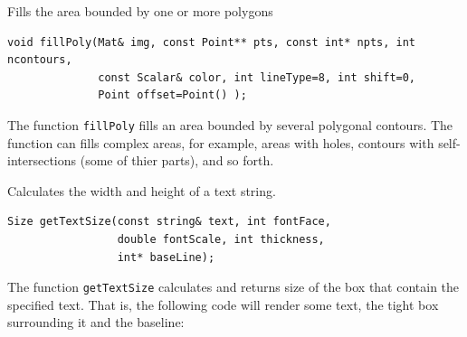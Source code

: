 \label{fillPoly}
Fills the area bounded by one or more polygons

\begin{lstlisting}
void fillPoly(Mat& img, const Point** pts, const int* npts, int ncontours,
              const Scalar& color, int lineType=8, int shift=0,
              Point offset=Point() );
\end{lstlisting}
\begin{description}
\end{description}

The function \texttt{fillPoly} fills an area bounded by several
polygonal contours. The function can fills complex areas, for example,
areas with holes, contours with self-intersections (some of thier parts), and so forth.

\label{getTextSize}
Calculates the width and height of a text string.

\begin{lstlisting}
Size getTextSize(const string& text, int fontFace,
                 double fontScale, int thickness,
                 int* baseLine);
\end{lstlisting}
\begin{description}
\end{description}

The function \texttt{getTextSize} calculates and returns size of the box that contain the specified text.
That is, the following code will render some text, the tight box surrounding it and the baseline:

